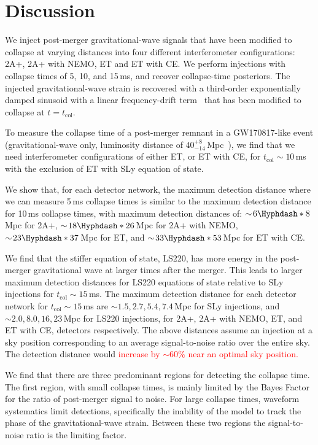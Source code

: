 \documentclass[
reprint,
prd,
twocolumn,
nofootinbib,
 amsmath,
showpacs ,amssymb, aps,%
superscriptaddress
]{revtex4-1}
\newcommand{\red}[1]{\textcolor{red}{#1}}
\newcommand{\tc}{t_{\mathrm{col}}}
\begin{document}
\section{Discussion}\label{sec:discussion}

    We inject post-merger gravitational-wave signals that have been modified to collapse at varying distances into four different interferometer configurations: 2A+, 2A+ with NEMO, ET and ET with CE.
    We perform injections with collapse times of 5, 10, and 15\,ms, and recover collapse-time posteriors.
    The injected gravitational-wave strain is recovered with a third-order exponentially damped sinusoid with a linear frequency-drift term~\cite{Easter2020} that has been modified to collapse at $t=\tc$. \par
    
    To measure the collapse time of a post-merger remnant in a GW170817-like event (gravitational-wave only, luminosity distance of $40^{+8}_{-14}$\,Mpc~\cite{GW170817multi}), we find that we need interferometer configurations of either ET, or ET with CE, for $\tc \sim\!10$\,ms with the exclusion of ET with SLy equation of state.
    
    
    We show that, for each detector network, the maximum detection distance where we can measure 5\,ms collapse times is similar to the maximum detection distance for 10\,ms collapse times, with maximum detection distances of: $\sim\!6\Hyphdash*8$\,Mpc for 2A+, $\sim\!18\Hyphdash*26$\,Mpc for 2A+ with NEMO, $\sim\!23\Hyphdash*37$\,Mpc for ET, and $\sim\!33\Hyphdash*53$\,Mpc for ET with CE.\par
    
    We find that the stiffer equation of state, LS220, has more energy in the post-merger gravitational wave at larger times after the merger.
    This leads to larger maximum detection distances for LS220 equations of state relative to SLy injections for $\tc\sim\!15$\,ms.
    The maximum detection distance for each detector network for $\tc\sim\!15$\,ms are $\sim 1.5, 2.7, 5.4, 7.4$\,Mpc for SLy injections, and $\sim 2.0, 8.0, 16, 23$\,Mpc for LS220 injections, for 2A+, 2A+ with NEMO, ET, and ET with CE, detectors respectively.
    The above distances assume an injection at a sky position corresponding to an average signal-to-noise ratio over the entire sky.
    The detection distance would \red{increase by $\sim\!60\%$ near an optimal sky position.} \par
    
    We find that there are three predominant regions for detecting the collapse time. The first region, with small collapse times, is mainly limited by the Bayes Factor for the ratio of post-merger signal to noise. 
    For large collapse times, waveform systematics limit detections, specifically the inability of the model to track the phase of the gravitational-wave strain.
    Between these two regions the signal-to-noise ratio is the limiting factor.\par
    
\end{document}
